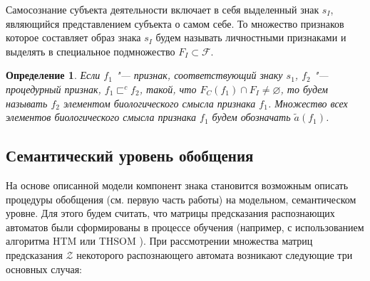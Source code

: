 \documentclass[a4paper, 12pt]{article}
\theoremstyle{break}
\newtheorem{Def}{Определение}
\numberwithin{equation}{section}
\begin{document}
	Самосознание субъекта деятельности включает в себя выделенный знак $s_I$, являющийся представлением субъекта о самом себе. То множество признаков которое составляет образ знака $s_I$ будем называть личностными признаками и выделять в специальное подмножество $F_I\subset\mathcal F$.
	
	\begin{Def}\label{def:meaning}
		Если $f_1$ "--- признак, соответствующий знаку $s_1$, $f_2$ "--- процедурный признак, $f_1\sqsubset^c f_2$, такой, что $F_C(f_1)\cap F_I\not = \varnothing$, то будем называть $f_2$ элементом биологического смысла признака $f_1$. Множество всех элементов биологического смысла признака $f_1$ будем обозначать $\tilde a(f_1)$.
	\end{Def}
	
	\subsection{Семантический уровень обобщения} На основе описанной модели компонент знака становится возможным описать процедуры обобщения (см. первую часть работы) на модельном, семантическом уровне. Для этого будем считать, что матрицы предсказания распознающих автоматов были сформированы в процессе обучения (например, с использованием алгоритма HTM \cite{Hawkins2009} или THSOM \cite{Koutn2008}). При рассмотрении множества матриц предсказания $\mathcal Z$ некоторого распознающего автомата возникают следующие три основных случая:
\end{document}
